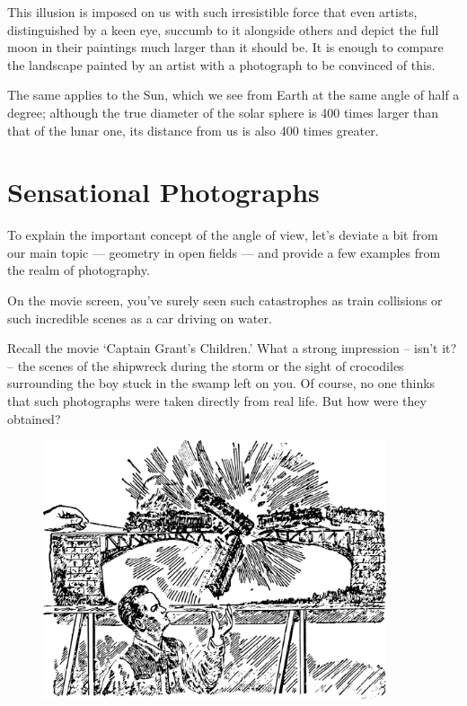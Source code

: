 This illusion is imposed on us with such irresistible force that even artists, distinguished by a keen eye, succumb to it alongside others and depict the full moon in their paintings much larger than it should be. It is enough to compare the landscape painted by an artist with a photograph to be convinced of this.

The same applies to the Sun, which we see from Earth at the same angle of half a degree; although the true diameter of the solar sphere is 400 times larger than that of the lunar one, its distance from us is also 400 times greater.


\section{Sensational Photographs}
\label{sec-3.5}

To explain the important concept of the angle of view, let's deviate a bit from our main topic — geometry in open fields — and provide a few examples from the realm of photography.

On the movie screen, you've surely seen such catastrophes as train collisions or such incredible scenes as a car driving on water.

Recall the movie `Captain Grant's Children.' What a strong impression -- isn't it? -- the scenes of the shipwreck during the storm or the sight of crocodiles surrounding the boy stuck in the swamp left on you. Of course, no one thinks that such photographs were taken directly from real life. But how were they obtained?
\begin{figure}[h!]
\centering
\includegraphics[width=0.9\textwidth]{figures/ch-03/fig-063.pdf}
\end{figure}


